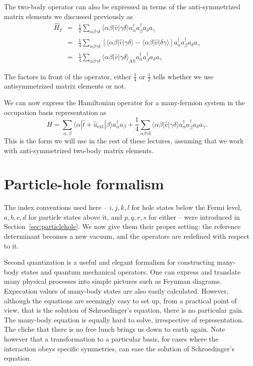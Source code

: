 The two-body operator can also be expressed in terms of the anti-symmetrized matrix elements we discussed previously as
\begin{align}
	\hat{H}_I &=& \frac{1}{2} \sum_{\alpha\beta\gamma\delta}  \langle \alpha \beta|\hat{v}|\gamma \delta\rangle
		a_\alpha^{\dagger} a_\beta^{\dagger} a_\delta a_\gamma \nonumber \\
	&=& \frac{1}{4} \sum_{\alpha\beta\gamma\delta} \left[ \langle \alpha \beta|\hat{v}|\gamma \delta\rangle -
		\langle \alpha \beta|\hat{v}|\delta\gamma \rangle \right] 
		a_\alpha^{\dagger} a_\beta^{\dagger} a_\delta a_\gamma \nonumber \\
	&=& \frac{1}{4} \sum_{\alpha\beta\gamma\delta} \langle \alpha \beta|\hat{v}|\gamma \delta\rangle_{\mathrm{AS}}
		a_\alpha^{\dagger} a_\beta^{\dagger} a_\delta a_\gamma \label{eq:2-45}
\end{align}

The factors in front of the operator, either  $\frac{1}{4}$ or 
$\frac{1}{2}$ tells whether we use antisymmetrized matrix elements or not. 

We can now express the Hamiltonian operator for a many-fermion system  in the occupation basis representation
as  
\begin{equation}
	H = \sum_{\alpha, \beta} \langle \alpha|\hat{t}+\hat{u}_{\mathrm{ext}}|\beta\rangle a_\alpha^{\dagger} a_\beta + \frac{1}{4} \sum_{\alpha\beta\gamma\delta}
		\langle \alpha \beta|\hat{v}|\gamma \delta\rangle a_\alpha^{\dagger} a_\beta^{\dagger} a_\delta a_\gamma. \label{eq:2-46b}
\end{equation}
This is the form we will use in the rest of these lectures, assuming that we work with anti-symmetrized two-body matrix elements.

\section{Particle-hole formalism}
\label{sec:phformalism}

The index conventions used here -- $i,j,k,l$ for hole states below the Fermi
level, $a,b,c,d$ for particle states above it, and $p,q,r,s$ for either -- were
introduced in Section~\ref{sec:particlehole}.  We now give them their proper
setting: the reference determinant becomes a new vacuum, and the operators are
redefined with respect to it.


Second quantization is a useful and elegant formalism  for constructing many-body  states and 
quantum mechanical operators. One can express and translate many physical processes
into simple pictures such as Feynman diagrams. Expecation values of many-body states are also easily calculated.
However, although the equations are seemingly easy to set up, from  a practical point of view, that is
the solution of Schroedinger's equation, there is no particular gain.
The many-body equation is equally hard to solve, irrespective of representation. 
The cliche that 
there is no free lunch brings us down to earth again.  
Note however that a transformation to a particular
basis, for cases where the interaction obeys specific symmetries, can ease the solution of Schroedinger's equation. 

